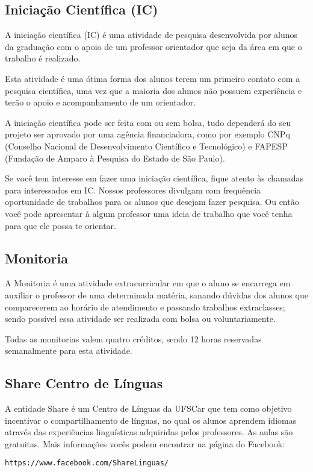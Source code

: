 \subsection{Iniciação Científica (IC)}
A iniciação científica (IC) é uma atividade de pesquisa desenvolvida por alunos da graduação com o apoio de um professor orientador que seja da área em que o trabalho é realizado.

Esta atividade é uma ótima forma dos alunos terem um primeiro contato com a pesquisa científica, uma vez que a maioria dos alunos não possuem experiência e terão o apoio e acompanhamento de um orientador.

A iniciação científica pode ser feita com ou sem bolsa, tudo dependerá do seu projeto ser aprovado por uma agência financiadora,  como por exemplo CNPq (Conselho Nacional de Desenvolvimento Científico e Tecnológico) e FAPESP (Fundação de Amparo à Pesquisa do Estado de São Paulo). 

Se você tem interesse em fazer uma iniciação científica, fique atento às chamadas para interessados em IC. Nossos professores divulgam com frequência oportunidade de trabalhos para os alunos que desejam fazer pesquisa. Ou então você pode apresentar à algum professor uma ideia de trabalho que você tenha para que ele possa te orientar.

\subsection{Monitoria}
A Monitoria é uma atividade extracurricular em que o aluno se encarrega em auxiliar o professor de uma determinada matéria, sanando dúvidas dos alunos que comparecerem ao horário de atendimento e passando trabalhos extraclasses; sendo possível essa atividade ser realizada com bolsa ou voluntariamente.

Todas as monitorias valem quatro créditos, sendo 12 horas reservadas semanalmente para esta atividade.

\subsection{Share Centro de Línguas}
A entidade Share é um Centro de Línguas da UFSCar que tem como objetivo incentivar o compartilhamento de línguas, no qual os alunos aprendem idiomas através das experiências linguísticas adquiridas pelos professores. As aulas são gratuitas.
Mais informações vocês podem encontrar na página do Facebook:

\texttt{https://www.facebook.com/ShareLinguas/}
